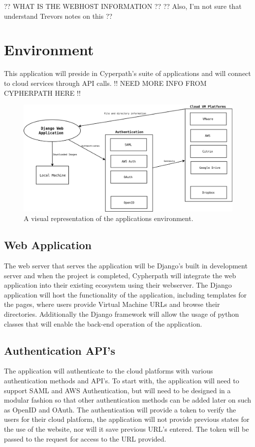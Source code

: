 \documentclass{article}
\begin{document}
	?? WHAT IS THE WEBHOST INFORMATION ?? 
	?? Also, I'm not sure that understand Trevors notes on this ??
	
    \section{Environment}
	This application will preside in Cyperpath's suite of applications and will connect to cloud services through API calls. 
    !! NEED MORE INFO FROM CYPHERPATH HERE !!
	
    \begin{figure}[h]
    \includegraphics[scale=.4]{downloader_env}
        \caption{A visual representation of the applications environment.}
    \end{figure}


        \subsection{Web Application}
        The web server that serves the application will be Django's built in development server and when the project is completed, Cypherpath will integrate
        the web application into their existing ecosystem using their webserver. The Django application will host the functionality of the application, including templates for the 
        pages, where users provide Virtual Machine URLs and browse their directories. Additionally the Django framework will allow the usage of python classes that will enable the 
        back-end operation of the application.

        
        \subsection{Authentication API's}
        The application will authenticate to the cloud platforms with various authentication methods and API's. To start with, the application will need to support
        SAML and AWS Authentication, but will need to be designed in a modular fashion so that other authentication methods can be added later on such as OpenID and OAuth.
        The authentication will provide a token to verify the users for their cloud platform, the application will not provide previous states for the use of the 
        website, nor will it save previous URL's entered. The token will be passed to the request for access to the URL provided.
\end{document}
